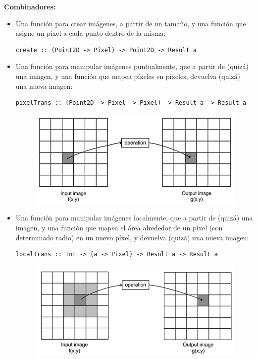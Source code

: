 \documentclass[a4paper, 11pt]{article} %
\begin{document}
	\textbf{Combinadores:}
	\begin{itemize}
		\item Una función para crear imágenes, a partir de un tamaño, y una función que asigne un píxel a cada punto dentro de la misma: 
		\begin{lstlisting}
create :: (Point2D -> Pixel) -> Point2D -> Result a
		\end{lstlisting}

		\item Una función para manipular imágenes puntualmente, que a partir de (quizá) una imagen, y una función que mapea píxeles en píxeles, devuelva (quizá) una nueva imagen:
		\begin{lstlisting}
pixelTrans :: (Point2D -> Pixel -> Pixel) -> Result a -> Result a
		\end{lstlisting}
		\begin{figure}[!h]
			\begin{center}
				\includegraphics[scale=0.4]{pixeltrans.png}
			\end{center}
		\end{figure}
			  
		\item Una función para manipular imágenes localmente, que a partir de (quizá) una imagen, y una función que mapea el área alrededor de un píxel (con determinado radio) en un nuevo píxel, y devuelva (quizá) una nueva imagen:
		\begin{lstlisting}
localTrans :: Int -> (a -> Pixel) -> Result a -> Result a
		\end{lstlisting}
		\begin{figure}[!h]
			\begin{center}
				\includegraphics[scale=0.4]{localtrans.png}
			\end{center}
		\end{figure}
	\end{itemize}
	
\end{document}
